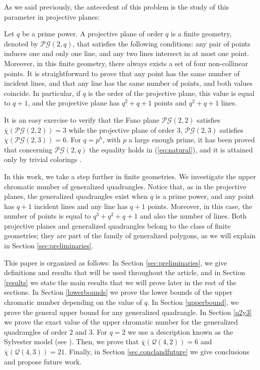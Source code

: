 \documentclass[12pt]{article}
\begin{document}
As we said previously, the antecedent of this problem is the study of this parameter in projective planes: 

Let $q$ be a prime power. A projective plane of order $q$ is a finite geometry, denoted by $\mathcal{PG}(2,q)$, that satisfies the following conditions: any pair of points induces one and only one line, and any two lines intersect in at most one point. Moreover, in this finite geometry, there always exists a set of four non-collinear points. 
It is straightforward to prove that any point has the same number of incident lines, and that any line has the same number of points, and both values coincide. In particular, if $q$ is the order of the projective plane, this value is equal to $q+1$, and the projective plane has $q^2+q+1$ points and $q^2+q+1$ lines. 

It is an easy exercise to verify that the Fano plane $\mathcal{PG}(2,2)$ satisfies $\overline{\chi}(\mathcal{PG}(2,2))=3$ while the projective plane of order $3$,  $\mathcal{PG}(2,3)$ satisfies 
$\overline{\chi}(\mathcal{PG}(2,3))=6$. For $q=p^h$, with  $p$ a large enough prime, it
has been proved that concerning $\mathcal{PG}(2,q)$ the equality holds in (\ref{eq:natural}), and it is attained only by trivial colorings  \cite{bhs}.

In this work, we take a step further in finite geometries. We investigate the upper chromatic number of generalized quadrangles. Notice that, as in the projective planes, the generalized quadrangles exist when $q$ is a prime power, and any point has $q+1$ incident lines and any line has $q+1$ points. Moreover, in this case, the number of points is equal to $q^3+q^2+q+1$ and also the number of lines. Both projective planes and generalized quadrangles belong to the class of finite geometries; they are part of the family of generalized polygons, as we will explain in Section \ref{sec:preliminaries}.

This paper is organized as follows: In Section \ref{sec:preliminaries}, we give definitions and results that will be used throughout the article, and in Section \ref{results} we state the main results that we will prove later in the rest of the sections. In Section \ref{lowerbounds} we prove the lower bounds of the upper chromatic number depending on the value of $q$. In Section \ref{upperbound}, we prove the general upper bound for any generalized quadrangle. In Section \ref{q2y3} we prove the exact value of the upper chromatic number for the generalized quadrangles of order $2$ and $3$. For $q=2$ we use a description known as the Sylvester model (see \cite{sylvester}). Then, we prove that $\overline{\chi}(\mathcal{Q}(4,2)) = 6$ and $\overline{\chi}(\mathcal{Q}(4,3)) = 21$. 
Finally, in Section \ref{sec.conclandfuture} we give conclusions and propose future work. 
\end{document}

